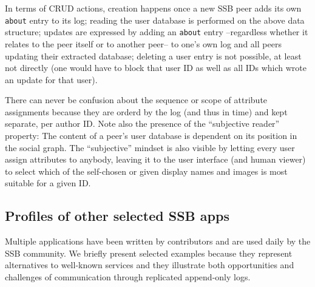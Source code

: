 \documentclass[sigconf]{acmart}
\begin{document}
\noindent
In terms of CRUD actions, creation happens once a new SSB peer adds
its own {\small\tt about} entry to its log; reading the user database
is performed on the above data structure; updates are expressed by
adding an {\small\tt about} entry --regardless whether it relates to
the peer itself or to another peer-- to one's own log and all peers
updating their extracted database; deleting a user entry is not
possible, at least not directly (one would have to block that user ID
as well as all IDs which wrote an update for that user).

There can never be confusion about the sequence or scope of attribute
assignments because they are orderd by the log (and thus in time) and
kept separate, per author ID. Note also the presence of the
``subjective reader'' property: The content of a peer's user database
is dependent on its position in the social graph. The ``subjective''
mindset is also visible by letting every user assign attributes to
anybody, leaving it to the user interface (and human viewer) to select
which of the self-chosen or given display names and images is most suitable
for a given ID.

\subsection{Profiles of other selected SSB apps}
\label{Section:AppProfiles}

Multiple applications have been written by contributors and are used daily by
the SSB community. We briefly present selected examples because they represent
alternatives to well-known services and they illustrate both opportunities and
challenges of communication through replicated append-only logs.
\end{document}
